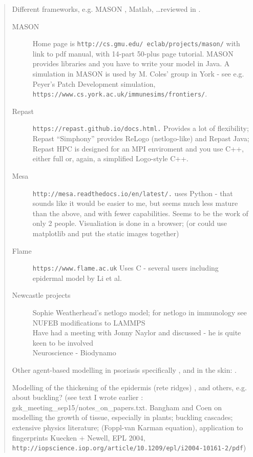 \documentclass[a4paper,10pt]{report}
\begin{document}
\begin{quote} 
Different  frameworks, e.g. MASON \cite{luke2005mason}, Matlab, \dots reviewed in \cite{macal2009agent}. \\
\begin{description}
\item [MASON] Home page is {\tt http://cs.gmu.edu/~eclab/projects/mason/} with link to pdf manual, with 14-part 50-plus page tutorial. MASON provides libraries and you have to write your model in Java. A simulation in MASON is used by M. Coles' group in York - see e.g. Peyer's Patch Development simulation, \cite{alden2012pairing} {\tt https://www.cs.york.ac.uk/immunesims/frontiers/}. 
\item [Repast] {\tt https://repast.github.io/docs.html.} Provides a lot of flexibility; Repast ``Simphony'' provides ReLogo (netlogo-like) and  Repast Java; Repast HPC is designed for an MPI enviroment and you use C++, either full or, again, a simplified Logo-style C++. 
\item [Mesa] {\tt http://mesa.readthedocs.io/en/latest/.} uses Python - that sounds like it would be easier to me, but seems much less mature than the above, and with fewer capabilities. Seems to be the work of only 2 people. Visualiation is done in a browser; (or could use matplotlib and put the static images together)
\item [Flame] {\tt https://www.flame.ac.uk} Uses C - several users including epidermal model by Li et al. 
\item [Newcastle projects] Sophie Weatherhead's netlogo model; for netlogo in immunology see \cite{chiacchio2014agent}\\
NUFEB modifications to LAMMPS \\
Have had a meeting with Jonny Naylor and discussed - he is quite keen to be involved \\
Neuroscience - Biodynamo \\
\end{description}

Other agent-based modelling  in psoriasis specifically 
\cite{sutterlin2009modeling}, and in the skin: \cite{li2013skin}.

Modelling of the thickening of the epidermis (rete ridges) \cite{iizuka2004psoriatic}, and others, e.g. about buckling? 
(see text I wrote earlier : gsk\_meeting\_sep15/notes\_on\_papers.txt. Bangham and Coen on modelling the growth of tissue, especially in plants; buckling cascades; extensive physics literature; (Foppl-van Karman equation), application to fingerprints  Kuecken + Newell, EPL 2004, {\tt http://iopscience.iop.org/article/10.1209/epl/i2004-10161-2/pdf})



 \end{quote} 
\end{document}
